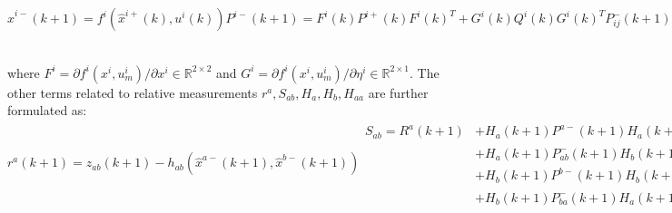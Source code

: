 \documentclass[conference]{IEEEtran}
\begin{document}
\begin{subequations}
	\begin{equation}
	\hat{x}^{i-}(k+1) = f^i(\hat{x}^{i+}(k),u^i(k))
	\label{equ::CEKF_main_xprop}
	\end{equation}
	\begin{equation}
	P^{i-}(k+1) = F^i(k)P^{i+}(k)F^i(k)^T + G^i(k)Q^i(k)G^i(k)^T
	\label{equ::CEKF_main_pprop}
	\end{equation}
	\begin{equation}
	P_{ij}^-(k+1) = F^i(k)P_{ij}^+(k)F^j(k)^T
	\label{equ::CEKF_main_corprop}
	\end{equation}
	\begin{equation}
	\hat{x}^{i+}(k+1) = \hat{x}^{i-}(k+1) + K_i(k+1)r^a(k+1)
	\label{equ::CEKF_main_xupdate}
	\end{equation}
	\begin{equation}
	P^{i+}(k+1) = P^{i-}(k+1) - K_i(k+1)S_{ab}(k+1)K_i(k+1)^T
	\label{equ::CEKF_main_pupdate}
	\end{equation}
	\begin{equation}
	P_{ij}^+(k+1) = P_{ij}^-(k+1) - K_i(k+1)S_{ab}(k+1)K_j(k+1)^T
	\label{equ::CEKF_main_corupdate}
	\end{equation}
	\begin{multline}
	K_i(k+1) = \\
	\begin{cases}
	0_{2\times2}, & \text{if no measurement} \\
	(P_{ia}^-(k+1)H_a^T + P_{ib}^-(k+1)H_b^T)S_{ab}^{-1}, &\text{if $a$ observes $b$} \\
	P_{ia}^-(k+1)H_{aa}^T S_{aa}^{-1}, &\text{if $a$ observes itself}
	\end{cases}
	\label{equ::CEKF_main_gain}
	\end{multline}
	\label{equ::CEKF_main}
\end{subequations}
where $F^i = \partial f^i (x^i,u_m^i)/\partial x^i \in\mathbb{R}^{2\times2}$ and $G^i = \partial f^i (x^i,u_m^i)/\partial \eta^i\in\mathbb{R}^{2\times1}$.
The other terms related to relative measurements $r^a,S_{ab},H_a,H_b,H_{aa}$ are further formulated as:
\begin{subequations}
	\begin{equation}
	r^a(k+1) = z_{ab}(k+1) - h_{ab}(\hat{x}^{a-}(k+1),\hat{x}^{b-}(k+1))
	\label{equ::CEKF_mea_inno}
	\end{equation}
	\begin{equation}
	\begin{split}
	S_{ab} = R^a(k+1) &+ H_a(k+1)P^{a-}(k+1)H_a(k+1)^T
	\\ &+ H_a(k+1)P_{ab}^{-}(k+1)H_b(k+1)^T
	\\ &+ H_b(k+1)P^{b-}(k+1)H_b(k+1)^T
	\\ &+ H_b(k+1)P_{ba}^{-}(k+1)H_a(k+1)^T
	\end{split}
	\end{equation}
\end{subequations}
\end{document}

